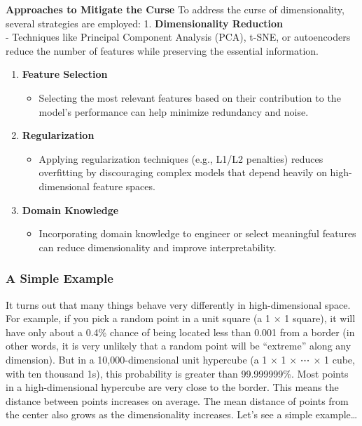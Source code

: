 \documentclass{article}
\providecommand{\tightlist}{%
      \setlength{\itemsep}{0pt}\setlength{\parskip}{0pt}}
\begin{document}
\textbf{Approaches to Mitigate the Curse} To address the curse of
dimensionality, several strategies are employed: 1.
\textbf{Dimensionality Reduction}\\
- Techniques like Principal Component Analysis (PCA), t-SNE, or
autoencoders reduce the number of features while preserving the
essential information.

\begin{enumerate}
\def\labelenumi{\arabic{enumi}.}
\setcounter{enumi}{1}
\tightlist
\item
  \textbf{Feature Selection}

  \begin{itemize}
  \tightlist
  \item
    Selecting the most relevant features based on their contribution to
    the model's performance can help minimize redundancy and noise.
  \end{itemize}
\item
  \textbf{Regularization}

  \begin{itemize}
  \tightlist
  \item
    Applying regularization techniques (e.g., L1/L2 penalties) reduces
    overfitting by discouraging complex models that depend heavily on
    high-dimensional feature spaces.
  \end{itemize}
\item
  \textbf{Domain Knowledge}

  \begin{itemize}
  \tightlist
  \item
    Incorporating domain knowledge to engineer or select meaningful
    features can reduce dimensionality and improve interpretability.
  \end{itemize}
\end{enumerate}

    \subsubsection{A Simple Example}\label{a-simple-example}

It turns out that many things behave very differently in
high-dimensional space. For example, if you pick a random point in a
unit square (a 1 × 1 square), it will have only about a 0.4\% chance of
being located less than 0.001 from a border (in other words, it is very
unlikely that a random point will be ``extreme'' along any dimension).
But in a 10,000-dimensional unit hypercube (a 1 × 1 × ⋯ × 1 cube, with
ten thousand 1s), this probability is greater than 99.999999\%. Most
points in a high-dimensional hypercube are very close to the border.
This means the distance between points increases on average. The mean
distance of points from the center also grows as the dimensionality
increases. Let's see a simple example\ldots{}
\end{document}
